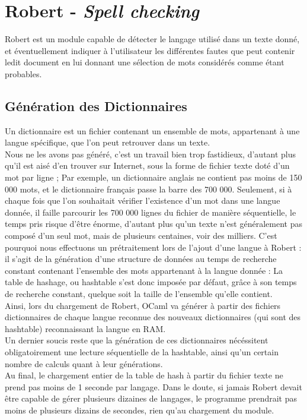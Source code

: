 \chapter{Robert - \emph{Spell checking}}

Robert est un module capable de détecter le langage utilisé dans un texte donné, et éventuellement
 indiquer à l'utilisateur les différentes fautes que peut contenir ledit document en lui donnant une
sélection de mots considérés comme étant probables.  

\section{Génération des Dictionnaires}
Un dictionnaire est un fichier contenant un ensemble de mots, appartenant à une langue spécifique,
que l'on peut retrouver dans un texte.\\
Nous ne les avons pas généré, c'est un travail bien trop fastidieux, d'autant plus qu'il est aisé d'en
trouver sur Internet, sous la forme de fichier texte doté d'un mot par ligne ; Par exemple, un dictionnaire
anglais ne contient pas moins de 150 000 mots, et le dictionnaire français passe la barre des 700 000.
Seulement, si à chaque fois que l'on souhaitait vérifier l'existence d'un mot dans une langue donnée, il
faille parcourir les 700 000 lignes du fichier de manière séquentielle, le temps pris risque d'être énorme,
d'autant plus qu'un texte n'est généralement pas composé d'un seul mot, mais de plusieurs centaines, voir des
milliers. C'est pourquoi nous effectuons un prétraitement lors de l'ajout d'une langue à Robert : il s'agit
de la génération d'une structure de données au temps de recherche constant contenant l'ensemble des mots
appartenant à la langue donnée : La table de hashage, ou hashtable s'est donc imposée par défaut, grâce à
son temps de recherche constant, quelque soit la taille de l'ensemble qu'elle contient. \\
Ainsi, lors du chargement de Robert, OCaml va générer à partir des fichiers dictionnaires de chaque langue
reconnue des nouveaux dictionnaires (qui sont des hashtable)  reconnaissant la langue en RAM. \\
Un dernier soucis reste que la génération de ces dictionnaires nécéssitent obligatoirement une lecture
séquentielle de la hashtable, ainsi qu'un certain nombre de calculs quant à leur générations. \\Au final,
le chargement entier de la table de hash à partir du fichier texte ne prend pas moins de 1 seconde par langage.
Dans le doute, si jamais Robert devait être capable de gérer plusieurs dizaines de langages, le programme prendrait
pas moins de plusieurs dizains de secondes, rien qu'au chargement du module.


